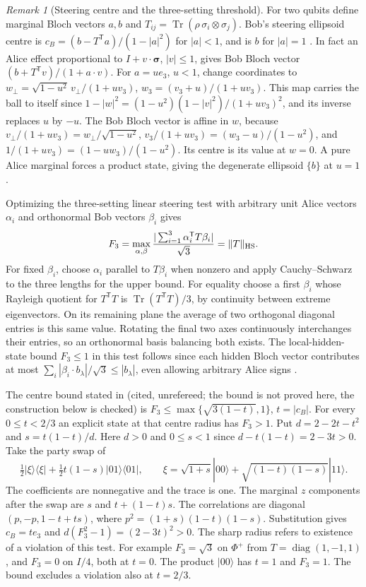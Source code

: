 \documentclass[aps,pra,onecolumn,superscriptaddress,nofootinbib,10pt]{revtex4-2}
\theoremstyle{definition}
\theoremstyle{remark}
\newtheorem{remark}[theorem]{Remark}
\newcommand{\tr}{\operatorname{Tr}}
\begin{document}
\begin{remark}[Steering centre and the three-setting threshold]
\label{ob:steering}
For two qubits define marginal Bloch vectors \(a,b\) and
\(T_{ij}=\tr(\rho\,\sigma_i\otimes\sigma_j)\).
Bob's steering ellipsoid centre is
\(c_B=(b-T^{\mathsf T}a)/(1-|a|^2)\) for \(|a|<1\), and is
\(b\) for \(|a|=1\) \cite{obr:jevtic}. In fact an Alice effect
proportional to \(I+v\cdot\boldsymbol{\sigma}\), \(|v|\le1\),
gives Bob Bloch vector \((b+T^{\mathsf T}v)/(1+a\cdot v)\).
For \(a=ue_3\), \(u<1\), change coordinates to
\(w_\perp=\sqrt{1-u^2}\,v_\perp/(1+uv_3)\),
\(w_3=(v_3+u)/(1+uv_3)\).
This map carries the ball to itself since
\(1-|w|^2=(1-u^2)(1-|v|^2)/(1+uv_3)^2\), and its inverse replaces
\(u\) by \(-u\). The Bob Bloch vector is affine in \(w\), because
\(v_\perp/(1+uv_3)=w_\perp/\sqrt{1-u^2}\),
\(v_3/(1+uv_3)=(w_3-u)/(1-u^2)\), and
\(1/(1+uv_3)=(1-u w_3)/(1-u^2)\). Its centre is its value at
\(w=0\). A pure Alice marginal forces a product state, giving the
degenerate ellipsoid \(\{b\}\) at \(u=1\).

Optimizing the three-setting
linear steering test with arbitrary unit Alice vectors \(\alpha_i\)
and orthonormal Bob vectors \(\beta_i\) gives
\[
 F_3=\max_{\alpha,\beta}\frac{|\sum_{i=1}^3
          \alpha_i^{\mathsf T}T\beta_i|}{\sqrt3}=\|T\|_{\rm HS}.
\]
For fixed \(\beta_i\), choose \(\alpha_i\) parallel to \(T\beta_i\)
when nonzero and apply Cauchy--Schwarz to the three lengths
for the upper bound. For equality choose a first \(\beta_i\) whose
Rayleigh quotient for \(T^{\mathsf T}T\) is \(\tr(T^{\mathsf T}T)/3\),
by continuity between extreme eigenvectors. On its remaining plane
the average of two orthogonal diagonal entries is this same value.
Rotating the final two axes continuously interchanges their entries,
so an orthonormal basis balancing both exists. The local-hidden-state
bound \(F_3\le1\) in this test follows since each hidden Bloch vector
contributes at most \(\sum_i|\beta_i\cdot b_{\lambda}|/\sqrt3
\le |b_\lambda|\), even allowing arbitrary Alice signs
\cite{obr:cjwr}.

The centre bound stated in \cite{obr:leansteering} (cited, unrefereed; the bound is not proved here, the construction below is checked) is
\(F_3\le\max\{\sqrt{3(1-t)},1\}\), \(t=|c_B|\). For every
\(0\le t<2/3\) an explicit state at that centre radius has \(F_3>1\).
Put \(d=2-2t-t^2\) and \(s=t(1-t)/d\). Here \(d>0\) and \(0\le s<1\)
since \(d-t(1-t)=2-3t>0\). Take the party swap of
\[
 \tfrac12|\xi\rangle\langle\xi|+\tfrac12 t(1-s)|01\rangle\langle01|,
 \qquad
 \xi=\sqrt{1+s}|00\rangle+\sqrt{(1-t)(1-s)}|11\rangle.
\]
The coefficients are nonnegative and the trace is one.
The marginal \(z\) components after the swap are \(s\) and
\(t+(1-t)s\). The correlations are diagonal
\((p,-p,1-t+ts)\), where \(p^2=(1+s)(1-t)(1-s)\).
Substitution gives \(c_B=te_3\) and
\(d(F_3^2-1)=(2-3t)^2>0\).
The sharp radius refers to existence of a violation of this test.
For example \(F_3=\sqrt3\) on \(\Phi^+\) from
\(T=\operatorname{diag}(1,-1,1)\), and \(F_3=0\) on \(I/4\),
both at \(t=0\). The product \(|00\rangle\) has \(t=1\) and
\(F_3=1\). The bound excludes a violation also at \(t=2/3\).
\end{remark}
\end{document}
